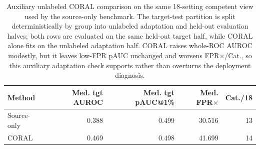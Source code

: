 \begin{table}[htbp]
\centering
\scriptsize
\setlength{\tabcolsep}{3pt}
\caption{Auxiliary unlabeled CORAL comparison on the same 18-setting competent view used by the source-only benchmark. The target-test partition is split deterministically by group into unlabeled adaptation and held-out evaluation halves; both rows are evaluated on the same held-out target half, while CORAL alone fits on the unlabeled adaptation half. CORAL raises whole-ROC AUROC modestly, but it leaves low-FPR pAUC unchanged and worsens FPR$\times$/Cat., so this auxiliary adaptation check supports rather than overturns the deployment diagnosis.}
\label{tab:acsac-coral-auxiliary}
\begin{tabular}{lrrrr}
\toprule
Method & Med. tgt AUROC & Med. tgt pAUC@1\% & Med. FPR$\times$ & Cat./18 \\
\midrule
Source-only & 0.388 & 0.499 & 30.516 & 13 \\
CORAL & 0.469 & 0.498 & 41.699 & 14 \\
\bottomrule
\end{tabular}
\end{table}
